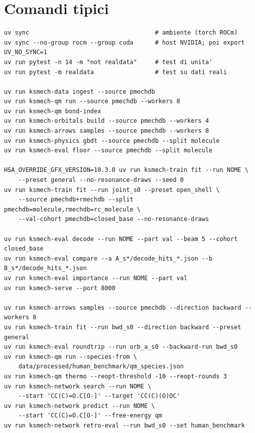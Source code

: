 \documentclass[11pt,a4paper]{report}
\begin{document}
\chapter{Comandi tipici}
\label{app:comandi}
\begin{verbatim}
uv sync                                   # ambiente (torch ROCm)
uv sync --no-group rocm --group cuda      # host NVIDIA; poi export UV_NO_SYNC=1
uv run pytest -n 14 -m "not realdata"     # test di unita'
uv run pytest -m realdata                 # test su dati reali

uv run ksmech-data ingest --source pmechdb
uv run ksmech-qm run --source pmechdb --workers 8
uv run ksmech-qm bond-index
uv run ksmech-orbitals build --source pmechdb --workers 4
uv run ksmech-arrows samples --source pmechdb --workers 8
uv run ksmech-physics gbdt --source pmechdb --split molecule
uv run ksmech-eval floor --source pmechdb --split molecule

HSA_OVERRIDE_GFX_VERSION=10.3.0 uv run ksmech-train fit --run NOME \
    --preset general --no-resonance-draws --seed 0
uv run ksmech-train fit --run joint_s0 --preset open_shell \
    --source pmechdb+rmechdb --split pmechdb=molecule,rmechdb=rc_molecule \
    --val-cohort pmechdb=closed_base --no-resonance-draws

uv run ksmech-eval decode --run NOME --part val --beam 5 --cohort closed_base
uv run ksmech-eval compare --a A_s*/decode_hits_*.json --b B_s*/decode_hits_*.json
uv run ksmech-eval importance --run NOME --part val
uv run ksmech-serve --port 8000

uv run ksmech-arrows samples --source pmechdb --direction backward --workers 8
uv run ksmech-train fit --run bwd_s0 --direction backward --preset general
uv run ksmech-eval roundtrip --run orb_a_s0 --backward-run bwd_s0
uv run ksmech-qm run --species-from \
    data/processed/human_benchmark/qm_species.json
uv run ksmech-qm thermo --reopt-threshold -10 --reopt-rounds 3
uv run ksmech-network search --run NOME \
    --start 'CC(C)=O.C[O-]' --target 'CC(C)(O)OC'
uv run ksmech-network predict --run NOME \
    --start 'CC(C)=O.C[O-]' --free-energy qm
uv run ksmech-network retro-eval --run bwd_s0 --set human_benchmark
\end{verbatim}

\end{document}
